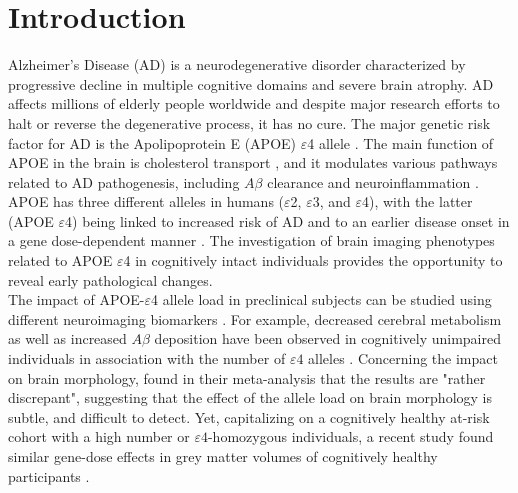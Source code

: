 \section{Introduction}
\label{sec:introduction}
Alzheimer's Disease (AD) is a neurodegenerative disorder characterized by progressive decline in multiple cognitive domains and severe brain atrophy. AD affects millions of elderly people worldwide \cite{AlzheimersAssociation} and despite major research efforts to halt or reverse the degenerative process, it has no cure. The major genetic risk factor for AD is the Apolipoprotein E (APOE) $\varepsilon$4 allele \cite{Saunders1993}. The main function of APOE in the brain is cholesterol transport \cite{Saunders1993}, and it modulates various pathways related to AD pathogenesis, including $A\beta$ clearance and neuroinflammation \cite{Zhao2018}. APOE has three different alleles in humans ($\varepsilon$2, $\varepsilon$3, and $\varepsilon$4), with the latter (APOE $\varepsilon$4) being linked to increased risk of AD and to an earlier disease onset in a gene dose-dependent manner \cite{Liu2013}. The investigation of brain imaging phenotypes related to APOE $\varepsilon$4 in cognitively intact individuals provides the opportunity to reveal early pathological changes. \\

The impact of APOE-$\varepsilon$4 allele load in preclinical subjects can be studied using different neuroimaging biomarkers \cite{Chetelat2013}. For example, decreased cerebral metabolism as well as increased $A\beta$ deposition have been observed in cognitively unimpaired individuals in association with the number of $\varepsilon4$ alleles \cite{Reiman2005,Reiman2009}. Concerning the impact on brain morphology, \cite{Fouquet2014} found in their meta-analysis that the results are "rather discrepant", suggesting that the effect of the allele load on brain morphology is subtle, and difficult to detect. Yet, capitalizing on a cognitively healthy at-risk cohort with a high number or $\varepsilon4$-homozygous individuals, a recent study found similar gene-dose effects in grey matter volumes of cognitively healthy participants \cite{Cacciaglia2018}. \\

